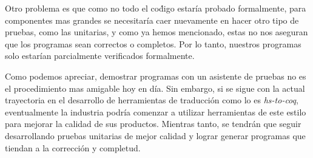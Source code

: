 Otro problema es que como no todo el co\'digo estaría probado formalmente, para componentes mas 
grandes se necesitaría caer nuevamente en hacer otro tipo de pruebas, como las unitarias, y como ya 
hemos mencionado, estas no nos aseguran que los programas sean correctos o completos. Por lo tanto, 
nuestros programas solo estarían parcialmente verificados formalmente.

Como podemos apreciar, demostrar programas con un asistente de pruebas no es el procedimiento mas 
amigable hoy en día. Sin embargo, si se sigue con la actual trayectoria en el desarrollo de 
herramientas de traducci\'on como lo es \textit{hs-to-coq}, eventualmente la industria podría 
comenzar a utilizar herramientas de este estilo para mejorar la calidad de sus productos. Mientras 
tanto, se tendrán que seguir desarrollando pruebas unitarias de mejor calidad y lograr generar 
programas que tiendan a la correcci\'on y completud.
